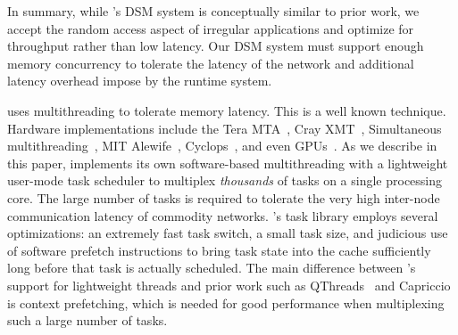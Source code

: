 In summary, while \Grappa's DSM system is conceptually similar to prior work,
we accept the random access aspect of irregular applications and optimize for
throughput rather than low latency. Our DSM system must support enough memory
concurrency to tolerate the latency of the network and additional latency
overhead impose by the runtime system.

\vspace{0.5ex}
 \Grappa uses multithreading to tolerate memory
latency. This is a well known technique. Hardware implementations include the
Tera MTA~\cite{tera:mta1}, Cray XMT~\cite{feo:xmt}, Simultaneous
multithreading~\cite{tullsen:smt}, MIT Alewife~\cite{agarwal:alewife},
Cyclops~\cite{almasi:cyclops}, and even GPUs~\cite{gpus}. As we describe in
this paper, \Grappa implements its own software-based multithreading with a
lightweight user-mode task scheduler to multiplex \emph{thousands\/} of tasks
on a single processing core. The large number of tasks is required to tolerate
the very high inter-node communication latency of commodity networks.
\Grappa's task library employs several optimizations: an extremely fast task
switch, a small task size, and judicious use of software prefetch instructions
to bring task state into the cache sufficiently long before that task is
actually scheduled. The main difference between \Grappa's support for
lightweight threads and prior work such as
QThreads~\cite{Wheeler08qthreads:an} and
Capriccio~\cite{Behren03capriccio:scalable} is context prefetching, which is needed for good performance when multiplexing such a large
number of tasks.

